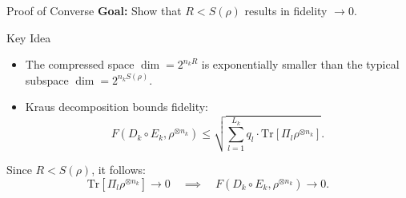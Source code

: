 \begin{frame}{Proof of Converse}
    \textbf{Goal:} Show that \( R < S(\rho) \) results in fidelity \( \to 0 \).
    \begin{block}{Key Idea}
        \begin{itemize}
            \item The compressed space \( \dim = 2^{n_k R} \) is exponentially smaller than the typical subspace \( \dim = 2^{n_k S(\rho)} \).
            \item Kraus decomposition bounds fidelity:
            \[
            F(D_k \circ E_k, \rho^{\otimes n_k}) \leq \sqrt{\sum_{l=1}^{L_k} q_l \cdot \text{Tr}[\Pi_l \rho^{\otimes n_k}]}.
            \]
        \end{itemize}
    \end{block}
    Since \( R < S(\rho) \), it follows:
    \[
    \text{Tr}[\Pi_l \rho^{\otimes n_k}] \to 0 \quad \implies \quad F(D_k \circ E_k, \rho^{\otimes n_k}) \to 0.
    \]
\end{frame}
